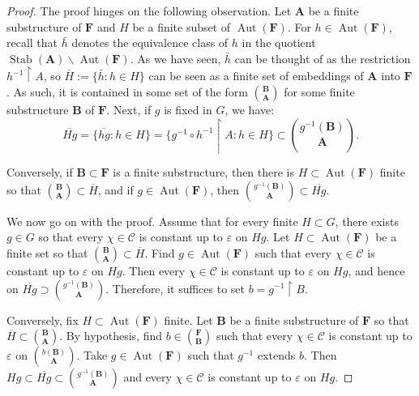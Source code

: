 \documentclass[10pt,a4paper]{article}
\theoremstyle{definition}
\numberwithin{equation}{section}
\numberwithin{figure}{section}
\numberwithin{table}{section}
\newcommand*{\mA}{\mathbf{A}}
\newcommand*{\mB}{\mathbf{B}}
\newcommand*{\mF}{\mathbf{F}}
\newcommand{\restrict}[2]{#1 \upharpoonright #2}
\newcommand{\e}{\varepsilon}
\DeclareMathOperator{\Aut}{Aut}
\DeclareMathOperator{\Stab}{Stab}
\begin{document}
\begin{proof}
The proof hinges on the following observation. Let $\mA$ be a finite substructure of $\mF$ and $H$ be a finite subset of $\Aut(\mF)$. For $h\in \Aut(\mF)$, recall that $\bar h$ denotes the equivalence class of $h$ in the quotient $\Stab(\mA)\backslash \Aut(\mF)$. As we have seen, $\bar h$ can be thought of as the restriction $\restrict{h^{-1}}{A}$, so $\overline H:=\{ \bar h:h\in H\}$ can be seen as a finite set of embeddings of $\mA$ into $\mF$. As such, it is contained in some set of the form $\binom{\mB}{\mA}$ for some finite substructure $\mB$ of $\mF$. Next, if $g$ is fixed in $G$, we have:
\[
\overline{Hg} = \{ \overline{hg}:h\in H\}=\{ \restrict{g^{-1}\circ h^{-1}}{A} : h\in H\} \subset \binom{g^{-1}(\mB)}{\mA}.
\]

Conversely, if $\mB \subset \mF$ is a finite substructure, then there is $H\subset \Aut(\mF)$ finite so that $\binom{\mB}{\mA}\subset \overline H$, and if $g\in \Aut(\mF)$, then $\binom{g^{-1}(\mB)}{\mA} \subset \overline{Hg}$.

We now go on with the proof. Assume that for every finite $H\subset G$, there exists $g\in G$ so that every $\chi \in \mathcal C$ is constant up to $\varepsilon$ on $Hg$. Let $H\subset \Aut(\mF)$ be a finite set so that $\binom{\mB}{\mA} \subset \overline H$. Find $g\in \Aut(\mF)$ such that every $\chi\in \mathcal C$ is constant up to $\varepsilon$ on $Hg$. Then every $\chi\in \mathcal C$ is constant up to $\e$ on $Hg$, and hence on $\overline{Hg}\supset \binom{g^{-1}(\mB)}{\mA}$. Therefore, it suffices to set $b=\restrict{g^{-1}}{B}$.

Conversely, fix $H\subset \Aut(\mF)$ finite. Let $\mB$ be a finite substructure of $\mF$ so that $\overline{H} \subset \binom{\mB}{\mA}$. By hypothesis, find $b\in \binom{\mF}{\mB}$ such that every $\chi\in \mathcal C$ is constant up to $\e$ on $\binom{b(\mB)}{\mA}$. Take $g\in \Aut(\mF)$ such that $g^{-1}$ extends $b$. Then $Hg\subset \overline{Hg}\subset \binom{g^{-1}(\mB)}{\mA}$ and every $\chi\in \mathcal C$ is constant up to $\varepsilon$ on $Hg$.
\end{proof}
\end{document}
